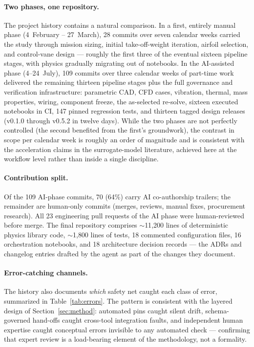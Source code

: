 \paragraph{Two phases, one repository.} The project history contains a
natural comparison. In a first, entirely manual phase (4~February --
27~March), 28 commits over seven calendar weeks carried the study
through mission sizing, initial take-off-weight iteration, airfoil
selection, and control-vane design --- roughly the first three of the
eventual sixteen pipeline stages, with physics gradually migrating out
of notebooks. In the AI-assisted phase (4--24~July), 109 commits over
three calendar weeks of part-time work delivered the remaining
thirteen pipeline stages plus the full governance and verification
infrastructure: parametric CAD, CFD cases, vibration, thermal, mass
properties, wiring, component freeze, the as-selected re-solve,
sixteen executed notebooks in CI, 147 pinned regression tests, and
thirteen tagged design releases (v0.1.0 through v0.5.2 in twelve
days). While the two phases are not perfectly controlled (the second
benefited from the first's groundwork), the contrast in scope per
calendar week is roughly an order of magnitude and is consistent with
the acceleration claims in the surrogate-model literature, achieved
here at the workflow level rather than inside a single discipline.

\paragraph{Contribution split.} Of the 109 AI-phase commits, 70
(64\%) carry AI co-authorship trailers; the remainder are human-only
commits (merges, reviews, manual fixes, procurement research). All 23
engineering pull requests of the AI phase were human-reviewed before
merge. The final repository comprises $\sim$11{,}200 lines of
deterministic physics library code, $\sim$1{,}800 lines of tests, 18
commented configuration files, 16 orchestration notebooks, and 18
architecture decision records --- the ADRs and changelog entries
drafted by the agent as part of the changes they document.

\paragraph{Error-catching channels.} The history also documents
\emph{which} safety net caught each class of error, summarized in
Table~\ref{tab:errors}. The pattern is consistent with the layered
design of Section~\ref{sec:method}: automated pins caught silent
drift, schema-governed hand-offs caught cross-tool integration faults,
and independent human expertise caught conceptual errors invisible to
any automated check --- confirming that expert review is a
load-bearing element of the methodology, not a formality.

